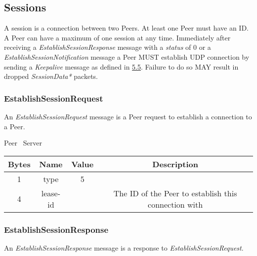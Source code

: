 \documentclass{article}
\begin{document}
    \subsection{Sessions}

    A session is a connection between two Peers. At least one Peer must have an ID. A Peer can have a maximum of one
    session at any time. Immediately after receiving a \emph{EstablishSessionResponse} message with a \emph{status}
    of 0 or a \emph{EstablishSessionNotification} message a Peer MUST establish UDP connection by sending a
    \emph{Keepalive} message as defined in \hyperlink{subsection.5.5}{5.5}. Failure to do so MAY result in dropped
    \emph{SessionData*} packets.

    \subsubsection{EstablishSessionRequest}

    An \emph{EstablishSessionRequest} message is a Peer request to establish a connection to a Peer.

    \begin{center}
        Peer \textrightarrow\ Server\\
        \begin{tabular}{|c|c|c|c|}
            \hline
            \textbf{Bytes} & \textbf{Name} & \textbf{Value} & \textbf{Description}                                 \\
            \hline
            1              & type          & 5              &                                                      \\
            \hline
            4              & lease-id      &                & The ID of the Peer to establish this connection with \\
            \hline
        \end{tabular}
    \end{center}

    \subsubsection{EstablishSessionResponse}

    An \emph{EstablishSessionResponse} message is a response to \emph{EstablishSessionRequest}.
\end{document}
